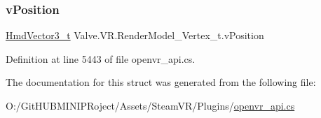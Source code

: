 \subsubsection{\texorpdfstring{vPosition}{vPosition}}
{\footnotesize\ttfamily \mbox{\hyperlink{struct_valve_1_1_v_r_1_1_hmd_vector3__t}{Hmd\+Vector3\+\_\+t}} Valve.\+V\+R.\+Render\+Model\+\_\+\+Vertex\+\_\+t.\+v\+Position}



Definition at line 5443 of file openvr\+\_\+api.\+cs.



The documentation for this struct was generated from the following file\+:\begin{DoxyCompactItemize}
\item 
O\+:/\+Git\+H\+U\+B\+M\+I\+N\+I\+P\+Roject/\+Assets/\+Steam\+V\+R/\+Plugins/\mbox{\hyperlink{openvr__api_8cs}{openvr\+\_\+api.\+cs}}\end{DoxyCompactItemize}

